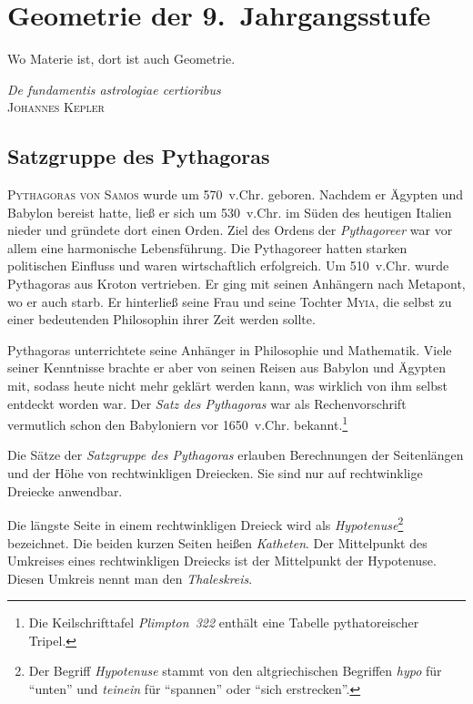\chapter{Geometrie der 9.~Jahrgangsstufe}
\epigraph{Wo Materie ist, dort ist auch Geometrie.}{\textit{De fundamentis astrologiae certioribus}\\\textsc{Johannes Kepler}}

\section{Satzgruppe des Pythagoras}

\textsc{Pythagoras von Samos} wurde um 570~v.Chr. geboren. Nachdem er Ägypten und Babylon bereist hatte, ließ er sich um 530~v.Chr. im Süden des heutigen Italien nieder und gründete dort einen Orden. Ziel des Ordens der \emph{Pythagoreer} war vor allem eine harmonische Lebensführung. Die Pythagoreer hatten starken politischen Einfluss und waren wirtschaftlich erfolgreich. Um 510~v.Chr. wurde Pythagoras aus Kroton vertrieben. Er ging mit seinen Anhängern nach Metapont, wo er auch starb. Er hinterließ seine Frau und seine Tochter \textsc{Myia}, die selbst zu einer bedeutenden Philosophin ihrer Zeit werden sollte.

Pythagoras unterrichtete seine Anhänger in Philosophie und Mathematik. Viele seiner Kenntnisse brachte er aber von seinen Reisen aus Babylon und Ägypten mit, sodass heute nicht mehr geklärt werden kann, was wirklich von ihm selbst entdeckt worden war. Der \emph{Satz des Pythagoras} war als Rechenvorschrift vermutlich schon den Babyloniern vor 1650~v.Chr. bekannt.\footnote{Die Keilschrifttafel \emph{Plimpton~322} enthält eine Tabelle pythatoreischer Tripel.} 

Die Sätze der \emph{Satzgruppe des Pythagoras} erlauben Berechnungen der Seitenlängen und der Höhe von rechtwinkligen Dreiecken. Sie sind nur auf rechtwinklige Dreiecke anwendbar.

Die längste Seite in einem rechtwinkligen Dreieck wird als \emph{Hypotenuse}\footnote{Der Begriff \emph{Hypotenuse} stammt von den altgriechischen Begriffen \emph{hypo} für "`unten"' und \emph{teinein} für "`spannen"' oder "`sich erstrecken"'.} bezeichnet. Die beiden kurzen Seiten heißen \emph{Katheten}. Der Mittelpunkt des Umkreises eines rechtwinkligen Dreiecks ist der Mittelpunkt der Hypotenuse. Diesen Umkreis nennt man den \emph{Thaleskreis}.

